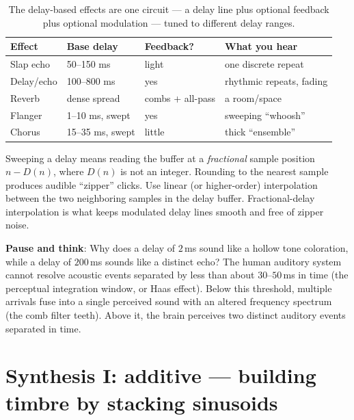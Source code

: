 \begin{table}[H]
\centering
\begin{tabular}{@{}llll@{}}
\toprule
Effect & Base delay & Feedback? & What you hear \\
\midrule
Slap echo   & 50--150 ms & light & one discrete repeat \\
Delay/echo  & 100--800 ms & yes & rhythmic repeats, fading \\
Reverb      & dense spread & combs + all-pass & a room/space \\
Flanger     & 1--10 ms, swept & yes & sweeping ``whoosh'' \\
Chorus      & 15--35 ms, swept & little & thick ``ensemble'' \\
\bottomrule
\end{tabular}
\caption{The delay-based effects are one circuit --- a delay line plus optional
feedback plus optional modulation --- tuned to different delay ranges.}
\label{ch28:tab-delay}
\end{table}

\begin{trapbox}
Sweeping a delay means reading the buffer at a \emph{fractional} sample position
$n-D(n)$, where $D(n)$ is not an integer. Rounding to the nearest sample produces
audible ``zipper'' clicks. Use linear (or higher-order) interpolation between the
two neighboring samples in the delay buffer. Fractional-delay interpolation is what
keeps modulated delay lines smooth and free of zipper noise.
\end{trapbox}

\begin{recoverybox}
\textbf{Pause and think}: Why does a delay of $2$\,ms sound like a hollow tone coloration, while a delay of $200$\,ms sounds like a distinct echo? The human auditory system cannot resolve acoustic events separated by less than about $30$--$50$\,ms in time (the perceptual integration window, or Haas effect). Below this threshold, multiple arrivals fuse into a single perceived sound with an altered frequency spectrum (the comb filter teeth). Above it, the brain perceives two distinct auditory events separated in time.
\end{recoverybox}

\section{Synthesis I: additive --- building timbre by stacking sinusoids}
\label{ch28:additive}

